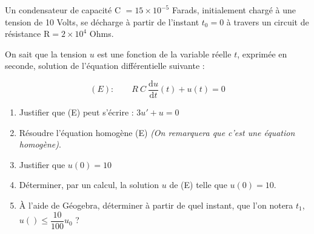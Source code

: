 Un condensateur de capacité C $= 15\times10^{-5}$ Farads, initialement chargé à une tension de 10 Volts, se décharge à partir de l'instant $t_0=0$ à travers un circuit de résistance R$ = 2\times10^4$ Ohms. 

\smallskip

On sait que la tension $u$ est une fonction de la variable réelle $t$, exprimée en seconde, solution de l'équation différentielle suivante :

$$(E) : \qquad R~C~\dfrac{\text{d}u}{\text{d}t}(t)+u(t)=0$$



\begin{enumerate}
	\item Justifier que (E) peut s'écrire : $3u'+u=0$\par \vspace*{0.5cm}

	\item Résoudre l'équation homogène (E) {\it \small (On remarquera que c'est une équation homogène)}.\par \vspace*{0.5cm}

%	
%	
%
%	
	
	\item Justifier que $u(0)=10$\par \vspace*{0.5cm}

	\item Déterminer, par un calcul, la solution $u$ de (E) telle que $u(0)=10$.\par \vspace*{0.5cm}

	
	\item À l'aide de Géogebra, déterminer à partir de quel instant, que l'on notera $t_1$, $u()\leq \dfrac{10}{100}u_0$ ?
	

\end{enumerate}
